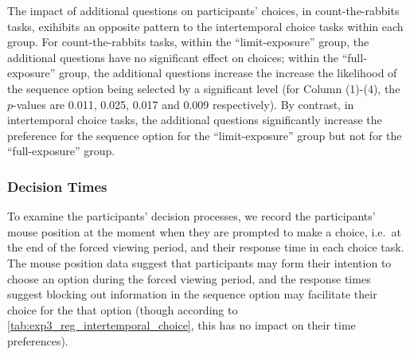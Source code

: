\documentclass[
  12pt,
]{article}
\begin{document}
The impact of additional questions on participants' choices, in
count-the-rabbits tasks, exihibits an opposite pattern to the
intertemporal choice tasks within each group. For count-the-rabbits
tasks, within the ``limit-exposure'' group, the additional questions
have no significant effect on choices; within the ``full-exposure''
group, the additional questions increase the increase the likelihood of
the sequence option being selected by a significant level (for Column
(1)-(4), the \(p\)-values are 0.011, 0.025, 0.017 and 0.009
respectively). By contrast, in intertemporal choice tasks, the
additional questions significantly increase the preference for the
sequence option for the ``limit-exposure'' group but not for the
``full-exposure'' group.



\hypertarget{decision-times}{%
\subsubsection{Decision Times}\label{decision-times}}

To examine the participants' decision processes, we record the
participants' mouse position at the moment when they are prompted to
make a choice, i.e.~at the end of the forced viewing period, and their
response time in each choice task. The mouse position data suggest that
participants may form their intention to choose an option during the
forced viewing period, and the response times suggest blocking out
information in the sequence option may facilitate their choice for the
that option (though according to
\ref{tab:exp3_reg_intertemporal_choice}, this has no impact on their
time preferences).
\end{document}

